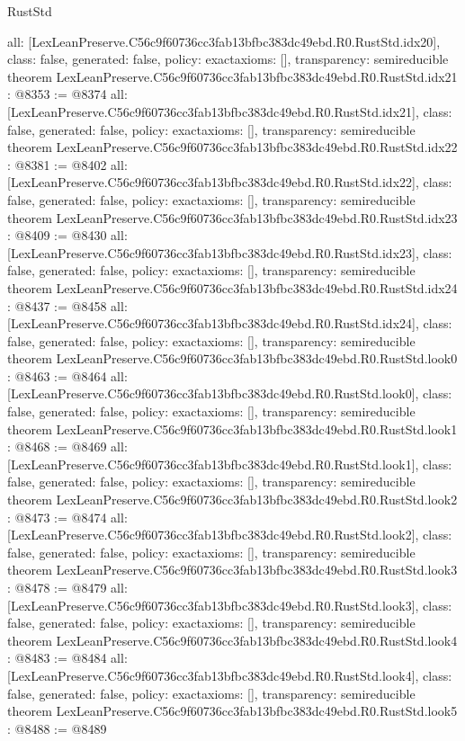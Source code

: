 \begin{lexlean}{RustStd}
\begin{coremodule}
{  all: [LexLeanPreserve.C56c9f60736cc3fab13bfbc383dc49ebd.R0.RustStd.idx20],
  class: false,
  generated: false,
  policy: exact{axioms: []},
  transparency: semireducible
}
theorem LexLeanPreserve.C56c9f60736cc3fab13bfbc383dc49ebd.R0.RustStd.idx21 : @8353 := @8374 {
  all: [LexLeanPreserve.C56c9f60736cc3fab13bfbc383dc49ebd.R0.RustStd.idx21],
  class: false,
  generated: false,
  policy: exact{axioms: []},
  transparency: semireducible
}
theorem LexLeanPreserve.C56c9f60736cc3fab13bfbc383dc49ebd.R0.RustStd.idx22 : @8381 := @8402 {
  all: [LexLeanPreserve.C56c9f60736cc3fab13bfbc383dc49ebd.R0.RustStd.idx22],
  class: false,
  generated: false,
  policy: exact{axioms: []},
  transparency: semireducible
}
theorem LexLeanPreserve.C56c9f60736cc3fab13bfbc383dc49ebd.R0.RustStd.idx23 : @8409 := @8430 {
  all: [LexLeanPreserve.C56c9f60736cc3fab13bfbc383dc49ebd.R0.RustStd.idx23],
  class: false,
  generated: false,
  policy: exact{axioms: []},
  transparency: semireducible
}
theorem LexLeanPreserve.C56c9f60736cc3fab13bfbc383dc49ebd.R0.RustStd.idx24 : @8437 := @8458 {
  all: [LexLeanPreserve.C56c9f60736cc3fab13bfbc383dc49ebd.R0.RustStd.idx24],
  class: false,
  generated: false,
  policy: exact{axioms: []},
  transparency: semireducible
}
theorem LexLeanPreserve.C56c9f60736cc3fab13bfbc383dc49ebd.R0.RustStd.look0 : @8463 := @8464 {
  all: [LexLeanPreserve.C56c9f60736cc3fab13bfbc383dc49ebd.R0.RustStd.look0],
  class: false,
  generated: false,
  policy: exact{axioms: []},
  transparency: semireducible
}
theorem LexLeanPreserve.C56c9f60736cc3fab13bfbc383dc49ebd.R0.RustStd.look1 : @8468 := @8469 {
  all: [LexLeanPreserve.C56c9f60736cc3fab13bfbc383dc49ebd.R0.RustStd.look1],
  class: false,
  generated: false,
  policy: exact{axioms: []},
  transparency: semireducible
}
theorem LexLeanPreserve.C56c9f60736cc3fab13bfbc383dc49ebd.R0.RustStd.look2 : @8473 := @8474 {
  all: [LexLeanPreserve.C56c9f60736cc3fab13bfbc383dc49ebd.R0.RustStd.look2],
  class: false,
  generated: false,
  policy: exact{axioms: []},
  transparency: semireducible
}
theorem LexLeanPreserve.C56c9f60736cc3fab13bfbc383dc49ebd.R0.RustStd.look3 : @8478 := @8479 {
  all: [LexLeanPreserve.C56c9f60736cc3fab13bfbc383dc49ebd.R0.RustStd.look3],
  class: false,
  generated: false,
  policy: exact{axioms: []},
  transparency: semireducible
}
theorem LexLeanPreserve.C56c9f60736cc3fab13bfbc383dc49ebd.R0.RustStd.look4 : @8483 := @8484 {
  all: [LexLeanPreserve.C56c9f60736cc3fab13bfbc383dc49ebd.R0.RustStd.look4],
  class: false,
  generated: false,
  policy: exact{axioms: []},
  transparency: semireducible
}
theorem LexLeanPreserve.C56c9f60736cc3fab13bfbc383dc49ebd.R0.RustStd.look5 : @8488 := @8489 {
}
\end{coremodule}
\end{lexlean}
